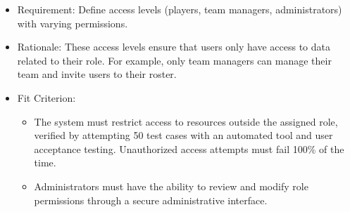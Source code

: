 \documentclass{article}
\begin{document}
\begin{enumerate}
          \begin{itemize}
              \item Requirement: Define access levels (players, team managers, administrators) with varying permissions.
              \item Rationale: These access levels ensure that users only have access to data related to their role. For example, only team managers can manage their team and invite users to their roster.
              \item Fit Criterion:
                    \begin{itemize}
                        \item The system must restrict access to resources outside the assigned role, verified by attempting 50 test cases with an automated tool and user acceptance testing. Unauthorized access attempts must fail 100\% of the time.
                        \item Administrators must have the ability to review and modify role permissions through a secure administrative interface.
                    \end{itemize}
          \end{itemize}
\end{enumerate}
\end{document}

